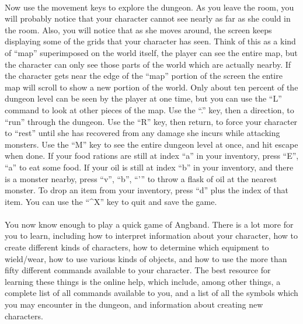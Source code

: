 \paragraph{}Now use the movement keys to explore the dungeon. As you leave the
room, you will probably notice that your character cannot see nearly as
far as she could in the room. Also, you will notice that as she moves
around, the screen keeps displaying some of the grids that your
character has seen. Think of this as a kind of ``map'' superimposed on
the world itself, the player can see the entire map, but the character
can only see those parts of the world which are actually nearby. If the
character gets near the edge of the ``map'' portion of the screen the
entire map will scroll to show a new portion of the world. Only about
ten percent of the dungeon level can be seen by the player at one time,
but you can use the ``L'' command to look at other pieces of the map. Use
the ``.'' key, then a direction, to ``run'' through the dungeon. Use the
``R'' key, then return, to force your character to ``rest'' until she has
recovered from any damage she incurs while attacking monsters. Use the
``M'' key to see the entire dungeon level at once, and hit escape when
done. If your food rations are still at index ``a'' in your inventory,
press ``E'', ``a'' to eat some food. If your oil is still at index ``b'' in
your inventory, and there is a monster nearby, press ``v'', ``b'', ``{'}'' to
throw a flask of oil at the nearest monster. To drop an item from your
inventory, press ``d'' plus the index of that item. You can use the
``\^{}X'' key to quit and save the game.

\paragraph{}You now know enough to play a quick game of Angband. There is a lot
more for you to learn, including how to interpret information about your
character, how to create different kinds of characters, how to determine
which equipment to wield/wear, how to use various kinds of objects, and
how to use the more than fifty different commands available to your
character. The best resource for learning these things is the online
help, which include, among other things, a complete list of all commands
available to you, and a list of all the symbols which you may encounter
in the dungeon, and information about creating new characters.

